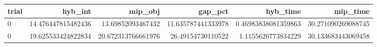 \begin{tabular}{lrrrrr}
\hline
trial & hyb_int & mip_obj & gap_pct & hyb_time & mip_time \\ \hline
0 & 14.476447815482436 & 13.69852093467432 & 11.635787441333978 & 0.46983838081359863 & 30.271090269088745 \\
0 & 19.625533424822834 & 20.672313766661976 & 26.49154730110522 & 1.1155626773834229 & 30.133683443069458 \\
\hline
\end{tabular}
